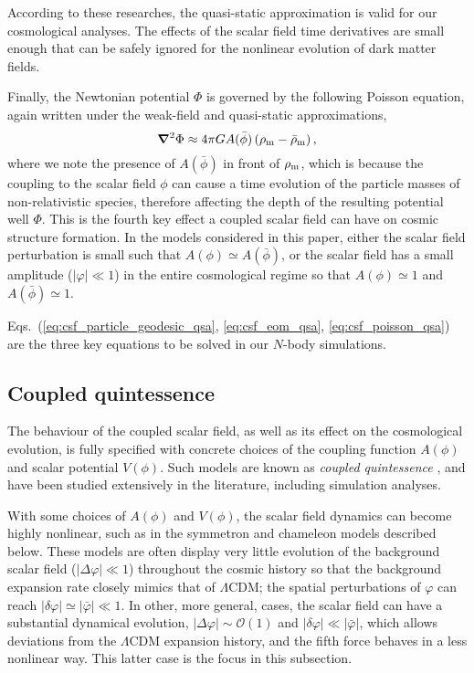 {According to these researches, the quasi-static approximation is valid for our cosmological analyses.
The effects of the scalar field time derivatives are small enough that can be safely ignored for the nonlinear evolution of dark matter fields.
}

Finally, the Newtonian potential $\Phi$ is governed by the following Poisson equation, again written under the weak-field and quasi-static approximations,
\begin{equation}\label{eq:csf_poisson_qsa}
    \boldsymbol{\nabla}^2\Phi \approx 4\pi{G}A(\bar{\phi})\left(\rho_{\rm m} - \bar{\rho}_{\rm m}\right),
\end{equation}
where we note the presence of $A(\bar{\phi})$ in front of $\rho_{\rm m}$, which is because the coupling to the scalar field $\phi$ can cause a time evolution of the particle masses of non-relativistic species, therefore affecting the depth of the resulting potential well $\Phi$. This is the fourth key effect a coupled scalar field can have on cosmic structure formation. In the models considered in this paper, either the scalar field perturbation is small such that $A(\phi)\simeq A(\bar{\phi})$, or the scalar field has a small amplitude ($|{\varphi}|\ll1$) in the entire cosmological regime so that $A(\phi)\simeq1$ and $A(\bar{\phi})\simeq1$. 

Eqs.~(\ref{eq:csf_particle_geodesic_qsa}, \ref{eq:csf_eom_qsa}, \ref{eq:csf_poisson_qsa}) are the three key equations to be solved in our $N$-body simulations.

\subsection{Coupled quintessence}
\label{subsect:csf}

The behaviour of the coupled scalar field, as well as its effect on the cosmological evolution, is fully specified with concrete choices of the coupling function $A(\phi)$ and scalar potential $V(\phi)$. Such models are known as \textit{coupled quintessence} \cite{Amendola:1999er}, and have been studied extensively in the literature, including simulation analyses.

With some choices of $A(\phi)$ and $V(\phi)$, the scalar field dynamics can become highly nonlinear, such as in the symmetron and chameleon models described below. These models are often display very little evolution of the background scalar field ($|\Delta\varphi|\ll1$) throughout the cosmic history so that the background expansion rate closely mimics that of $\Lambda$CDM; the spatial perturbations of $\varphi$ can reach $|\delta\varphi|\simeq|\bar{\varphi}|\ll1$. In other, more general, cases, the scalar field can have a substantial dynamical evolution, $|\Delta\varphi|\sim\mathcal{O}(1)$ and $|\delta\varphi|\ll|\bar{\varphi}|$, which allows deviations from the $\Lambda$CDM expansion history, and the fifth force behaves in a less nonlinear way. This latter case is the focus in this subsection. 

